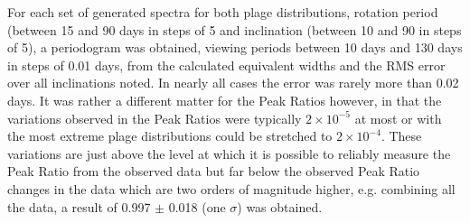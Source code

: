 \begin{table}[!htbp]
\caption{Simulated mean equivalent widths with associated standard deviations from simulations for the 2.7\%
  plage distributions and a set of rotation periods and inclinations. In the first table results are illustrated for
  various periods and for 30{\degree}, 60{\degree} and  90{\degree} inclinations. In the second table results are
  illustrated for various inclinations and 70, 80 and 90-day periods as these are close to the
  rotation period of \prox.}
\protect\label{table:modelcomp}
\end{table}

For each set of generated spectra for both plage distributions, rotation period (between 15 and 90 days in steps of 5
and inclination (between 10{\degree} and 90{\degree} in steps of 5\degree), a periodogram was obtained, viewing periods
between 10 days and 130 days in steps of 0.01 days, from the calculated equivalent widths and the RMS error over
all inclinations noted. In nearly all cases the error was rarely more than 0.02 days. It was rather a different matter for the
Peak Ratios however, in that the variations observed in the Peak Ratios were typically $2{\times}10^{-5}$ at most or with
the most extreme plage distributions could be stretched to $2{\times}10^{-4}$. These variations are just above the level
at which it is possible to reliably measure the Peak Ratio from the observed data but far below the observed Peak Ratio
changes in the data which are two orders of magnitude higher, e.g. combining all the {\harps} data, a result of 0.997 $
\pm $ 0.018 (one $\sigma$) was obtained.

